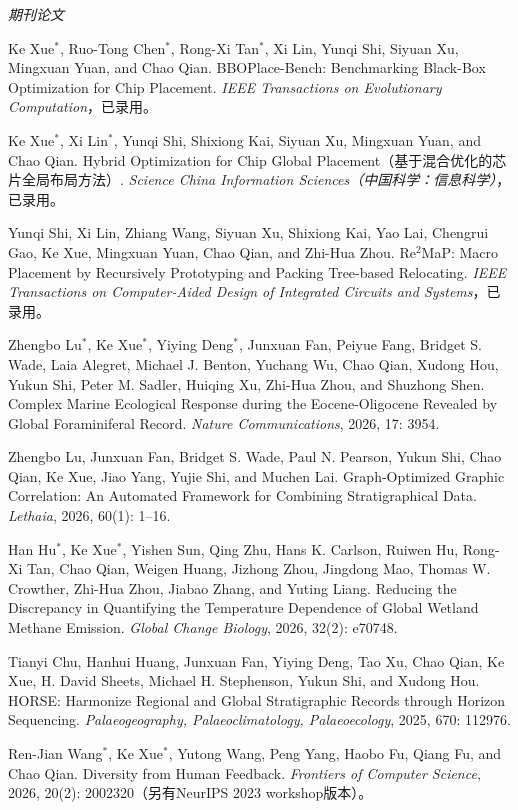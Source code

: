 \documentclass[10pt,a4paper,fontset=fandol]{ctexart}
\begin{document}
\textit{期刊论文}
\begin{cvbullet}
  \item Ke Xue$^*$, Ruo-Tong Chen$^*$, Rong-Xi Tan$^*$, Xi Lin, Yunqi Shi, Siyuan Xu, Mingxuan Yuan, and Chao Qian. BBOPlace-Bench: Benchmarking Black-Box Optimization for Chip Placement. \textit{IEEE Transactions on Evolutionary Computation}，已录用。
  \item Ke Xue$^*$, Xi Lin$^*$, Yunqi Shi, Shixiong Kai, Siyuan Xu, Mingxuan Yuan, and Chao Qian. Hybrid Optimization for Chip Global Placement（基于混合优化的芯片全局布局方法）. \textit{Science China Information Sciences（中国科学：信息科学）}，已录用。
  \item Yunqi Shi, Xi Lin, Zhiang Wang, Siyuan Xu, Shixiong Kai, Yao Lai, Chengrui Gao, Ke Xue, Mingxuan Yuan, Chao Qian, and Zhi-Hua Zhou. Re$^2$MaP: Macro Placement by Recursively Prototyping and Packing Tree-based Relocating. \textit{IEEE Transactions on Computer-Aided Design of Integrated Circuits and Systems}，已录用。
  \item Zhengbo Lu$^*$, Ke Xue$^*$, Yiying Deng$^*$, Junxuan Fan, Peiyue Fang, Bridget S. Wade, Laia Alegret, Michael J. Benton, Yuchang Wu, Chao Qian, Xudong Hou, Yukun Shi, Peter M. Sadler, Huiqing Xu, Zhi-Hua Zhou, and Shuzhong Shen. Complex Marine Ecological Response during the Eocene-Oligocene Revealed by Global Foraminiferal Record. \textit{Nature Communications}, 2026, 17: 3954.
  \item Zhengbo Lu, Junxuan Fan, Bridget S. Wade, Paul N. Pearson, Yukun Shi, Chao Qian, Ke Xue, Jiao Yang, Yujie Shi, and Muchen Lai. Graph-Optimized Graphic Correlation: An Automated Framework for Combining Stratigraphical Data. \textit{Lethaia}, 2026, 60(1): 1--16.
  \item Han Hu$^*$, Ke Xue$^*$, Yishen Sun, Qing Zhu, Hans K. Carlson, Ruiwen Hu, Rong-Xi Tan, Chao Qian, Weigen Huang, Jizhong Zhou, Jingdong Mao, Thomas W. Crowther, Zhi-Hua Zhou, Jiabao Zhang, and Yuting Liang. Reducing the Discrepancy in Quantifying the Temperature Dependence of Global Wetland Methane Emission. \textit{Global Change Biology}, 2026, 32(2): e70748.
  \item Tianyi Chu, Hanhui Huang, Junxuan Fan, Yiying Deng, Tao Xu, Chao Qian, Ke Xue, H. David Sheets, Michael H. Stephenson, Yukun Shi, and Xudong Hou. HORSE: Harmonize Regional and Global Stratigraphic Records through Horizon Sequencing. \textit{Palaeogeography, Palaeoclimatology, Palaeoecology}, 2025, 670: 112976.
  \item Ren-Jian Wang$^*$, Ke Xue$^*$, Yutong Wang, Peng Yang, Haobo Fu, Qiang Fu, and Chao Qian. Diversity from Human Feedback. \textit{Frontiers of Computer Science}, 2026, 20(2): 2002320（另有NeurIPS 2023 workshop版本）。

\end{cvbullet}
\end{document}
